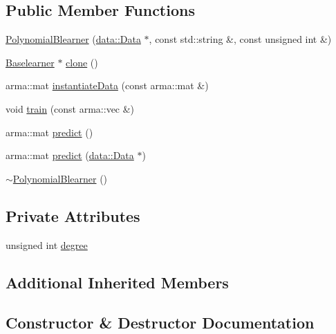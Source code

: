 \subsection*{Public Member Functions}
\begin{DoxyCompactItemize}
\item 
\hyperlink{classblearner_1_1_polynomial_blearner_a295589dd57691401ccaf49e4ec5cca8f}{Polynomial\+Blearner} (\hyperlink{classdata_1_1_data}{data\+::\+Data} $\ast$, const std\+::string \&, const unsigned int \&)
\item 
\hyperlink{classblearner_1_1_baselearner}{Baselearner} $\ast$ \hyperlink{classblearner_1_1_polynomial_blearner_a4a93ace818c330e5d1f572108ba061c0}{clone} ()
\item 
arma\+::mat \hyperlink{classblearner_1_1_polynomial_blearner_a5d3a44e8a4a8155ac24ee05e2c68af75}{instantiate\+Data} (const arma\+::mat \&)
\item 
void \hyperlink{classblearner_1_1_polynomial_blearner_acf24025a73293a2569450dd4659e0997}{train} (const arma\+::vec \&)
\item 
arma\+::mat \hyperlink{classblearner_1_1_polynomial_blearner_a422569884414d31db5a2b770b22176c3}{predict} ()
\item 
arma\+::mat \hyperlink{classblearner_1_1_polynomial_blearner_ae321c17adaab23b0d27685920c2608af}{predict} (\hyperlink{classdata_1_1_data}{data\+::\+Data} $\ast$)
\item 
\hyperlink{classblearner_1_1_polynomial_blearner_ac3acf16e62db3dc6c34b4290f9f04f04}{$\sim$\+Polynomial\+Blearner} ()
\end{DoxyCompactItemize}
\subsection*{Private Attributes}
\begin{DoxyCompactItemize}
\item 
unsigned int \hyperlink{classblearner_1_1_polynomial_blearner_a7a522e19634367a4bfad2d6ea532ec44}{degree}
\end{DoxyCompactItemize}
\subsection*{Additional Inherited Members}


\subsection{Constructor \& Destructor Documentation}
\mbox{\label{classblearner_1_1_polynomial_blearner_a295589dd57691401ccaf49e4ec5cca8f}} 
